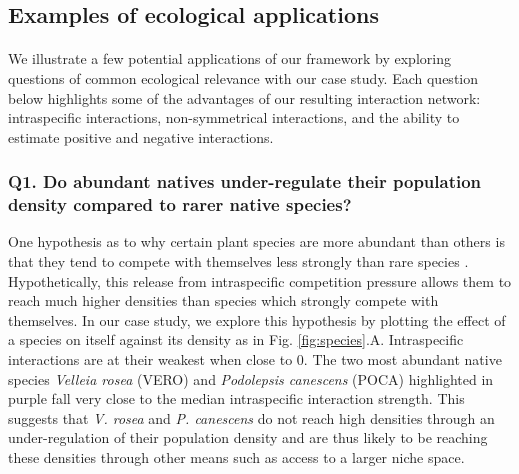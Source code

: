 \documentclass[a4,12pt]{article}
\begin{document}
\begin{refsection}
    \subsection{Examples of ecological applications}

    \paragraph{}
    We illustrate a few potential applications of our framework by exploring questions of common ecological relevance with our case study. Each question below highlights some of the advantages of our resulting interaction network: intraspecific interactions, non-symmetrical interactions, and the ability to estimate positive and negative interactions. 

    \subsubsection*{Q1. Do abundant natives under-regulate their population density compared to rarer native species?}
    One hypothesis as to why certain plant species are more abundant than others is that they tend to compete with themselves less strongly than rare species \parencite{Yenni2012, Yenni2017}. Hypothetically, this release from intraspecific competition pressure allows them to reach much higher densities than species which strongly compete with themselves. In our case study, we explore this hypothesis by plotting the effect of a species on itself against its density as in Fig. \ref{fig:species}.A. Intraspecific interactions are at their weakest when close to $0$. The two most abundant native species \textit{Velleia rosea} (VERO) and \textit{Podolepsis canescens} (POCA) highlighted in purple fall very close to the median intraspecific interaction strength. This suggests that \textit{V. rosea} and \textit{P. canescens} do not reach high densities through an under-regulation of their population density and are thus likely to be reaching these densities through other means such as access to a larger niche space. 


\end{refsection}
\end{document}
